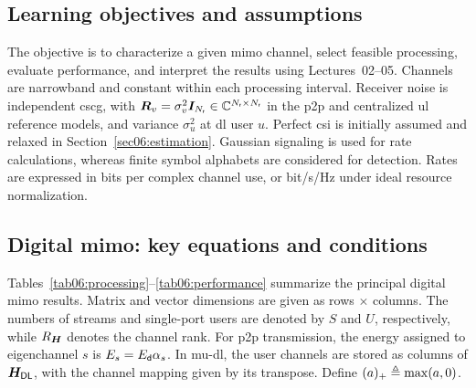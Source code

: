 \subsection{Learning objectives and assumptions}
The objective is to characterize a given \ac{mimo} channel, select feasible processing, evaluate performance, and interpret the results using Lectures~02--05. Channels are narrowband and constant within each processing interval. Receiver noise is independent \ac{cscg}, with $\bm{R}_v=\sigma_v^2\bm{I}_{N_{\mathsf{r}}}\in\mathbb{C}^{N_{\mathsf{r}}\times N_{\mathsf{r}}}$ in the \ac{p2p} and centralized \ac{ul} reference models, and variance $\sigma_u^2$ at \ac{dl} user $u$. Perfect \ac{csi} is initially assumed and relaxed in Section~\ref{sec06:estimation}. Gaussian signaling is used for rate calculations, whereas finite symbol alphabets are considered for detection. Rates are expressed in bits per complex channel use, or bit/s/Hz under ideal resource normalization.

\subsection{Digital \ac{mimo}: key equations and conditions}
\label{sec06:reference}
Tables~\ref{tab06:processing}--\ref{tab06:performance} summarize the principal digital \ac{mimo} results. Matrix and vector dimensions are given as rows $\times$ columns. The numbers of streams and single-port users are denoted by $S$ and $U$, respectively, while $R_{\bm{H}}$ denotes the channel rank. For \ac{p2p} transmission, the energy assigned to eigenchannel $s$ is $E_s=E_{\mathsf{d}}\alpha_s$. In \ac{mu}-\ac{dl}, the user channels are stored as columns of $\bm{H}_{\mathsf{DL}}$, with the channel mapping given by its transpose. Define $(a)_+\triangleq\max(a,0)$.

